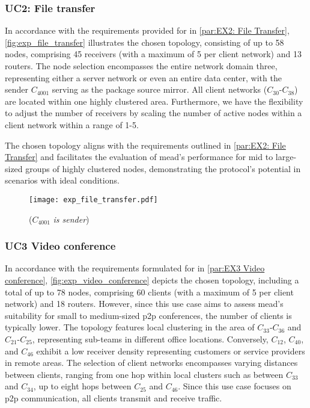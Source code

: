 \subsubsection{UC2: File transfer} %
\label{par:implEX2: File transfer}
In accordance with the requirements provided for \ucii{} in
    \autoref{par:EX2: File Transfer}, \autoref{fig:exp_file_transfer}
    illustrates the chosen topology, consisting of up to 58 nodes, comprising
    45 receivers (with a maximum of 5 per client network) and 13 routers.
The node selection encompasses the entire network domain three, representing
    either a server network or even an entire data center, with the sender
    $C_{4001}$ serving as the package source mirror. 
All client networks ($C_{30}$-$C_{38}$) are located within one highly
    clustered area.
Furthermore, we have the flexibility to adjust the number of receivers by
    scaling the number of active nodes within a client network within a range
    of 1-5.

The chosen topology aligns with the requirements outlined in
    \autoref{par:EX2: File Transfer} and facilitates the evaluation of
    \gls{mead}'s performance for mid to large-sized groups of highly clustered
    nodes, demonstrating the protocol's potential in scenarios with ideal
    conditions.

\begin{figure}
    \begin{center}
        \texttt{[image: exp\_file\_transfer.pdf]}
    \end{center}
    \caption[UC2: File Transfer]{\nucii{} ($C_{4001}$ \textit{is sender})}
    \label{fig:exp_file_transfer}
\end{figure}

\subsubsection{UC3 Video conference} %
\label{par:impl EX3 Video conference}
In accordance with the requirements formulated for \uciii{} in
    \autoref{par:EX3 Video conference}, \autoref{fig:exp_video_conference}
    depicts the chosen topology, including a total of up to 78 nodes, comprising
    60 clients (with a maximum of 5 per client network) and 18 routers.
However, since this use case aims to assess \gls{mead}'s suitability for small
    to medium-sized \gls{p2p} conferences, the number of clients is typically
    lower.
The topology features local clustering in the area of $C_{33}$-$C_{36}$
    and $C_{21}$-$C_{25}$, representing sub-teams in different office locations.
Conversely, $C_{12}$, $C_{40}$, and $C_{46}$ exhibit a low receiver density
    representing customers or service providers in remote areas.
The selection of client networks encompasses varying distances between clients,
    ranging from one hop within local clusters such as between $C_{33}$ and
    $C_{34}$, up to eight hops between $C_{25}$ and $C_{46}$.
Since this use case focuses on \gls{p2p} communication, all clients transmit
    and receive traffic.

